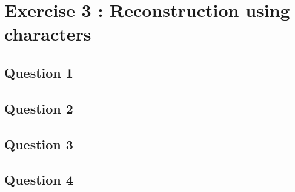 \documentclass[]{article}
\begin{document}
\section{Exercise 3 : Reconstruction using characters}
\subsection{Question 1}
\subsection{Question 2}
\subsection{Question 3}
\subsection{Question 4}
\end{document}
